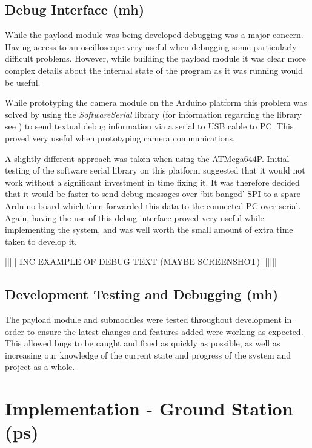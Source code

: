 \section{Debug Interface (mh)}
\label{sec:payload_debug_interface}
While the payload module was being developed debugging was a major concern. 
Having access to an oscilloscope very useful when debugging some particularly 
difficult problems.
However, while building the payload module it was clear more complex details 
about the internal state of the program as it was running would be useful.

While prototyping the camera module on the Arduino platform this problem was 
solved by using the \emph{SoftwareSerial} library (for information regarding 
the library see \cite{software_serial}) to send textual debug information via
a serial to USB cable to PC. This proved very useful when prototyping camera
communications.

A slightly different approach was taken when using the ATMega644P. Initial 
testing of the software serial library on this platform suggested that it 
would not work without a significant investment in time fixing it. It was
therefore decided that it would be faster to send debug messages over 
`bit-banged' SPI to a spare Arduino board which then forwarded this data to 
the connected PC over serial. Again, having the use of this debug interface 
proved very useful while implementing the system, and was well worth the 
small amount of extra time taken to develop it.

||||| INC EXAMPLE OF DEBUG TEXT (MAYBE SCREENSHOT) ||||||

\section{Development Testing and Debugging (mh)}
The payload module and submodules were tested throughout development in order 
to ensure the latest changes and features added were working as expected. 
This allowed bugs to be caught and fixed as quickly as possible, as well as
increasing our knowledge of the current state and progress of the system and
project as a whole.



\chapter{Implementation - Ground Station (ps)}





